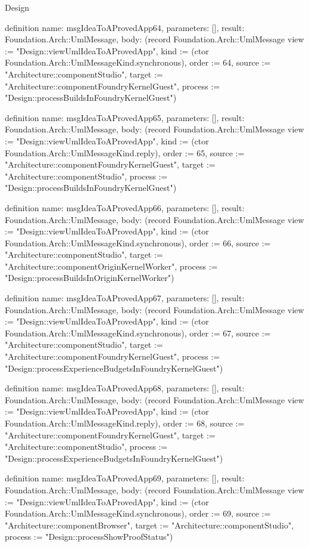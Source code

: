 \begin{lexlean}{Design}
\begin{semanticmodule}
definition{
  name: msgIdeaToAProvedApp64,
  parameters: [],
  result: Foundation.Arch::UmlMessage,
  body: (record Foundation.Arch::UmlMessage {view := "Design::viewUmlIdeaToAProvedApp", kind := (ctor Foundation.Arch::UmlMessageKind.synchronous), order := 64, source := "Architecture::componentStudio", target := "Architecture::componentFoundryKernelGuest", process := "Design::processBuildsInFoundryKernelGuest"})
}

definition{
  name: msgIdeaToAProvedApp65,
  parameters: [],
  result: Foundation.Arch::UmlMessage,
  body: (record Foundation.Arch::UmlMessage {view := "Design::viewUmlIdeaToAProvedApp", kind := (ctor Foundation.Arch::UmlMessageKind.reply), order := 65, source := "Architecture::componentFoundryKernelGuest", target := "Architecture::componentStudio", process := "Design::processBuildsInFoundryKernelGuest"})
}

definition{
  name: msgIdeaToAProvedApp66,
  parameters: [],
  result: Foundation.Arch::UmlMessage,
  body: (record Foundation.Arch::UmlMessage {view := "Design::viewUmlIdeaToAProvedApp", kind := (ctor Foundation.Arch::UmlMessageKind.synchronous), order := 66, source := "Architecture::componentStudio", target := "Architecture::componentOriginKernelWorker", process := "Design::processBuildsInOriginKernelWorker"})
}

definition{
  name: msgIdeaToAProvedApp67,
  parameters: [],
  result: Foundation.Arch::UmlMessage,
  body: (record Foundation.Arch::UmlMessage {view := "Design::viewUmlIdeaToAProvedApp", kind := (ctor Foundation.Arch::UmlMessageKind.synchronous), order := 67, source := "Architecture::componentStudio", target := "Architecture::componentFoundryKernelGuest", process := "Design::processExperienceBudgetsInFoundryKernelGuest"})
}

definition{
  name: msgIdeaToAProvedApp68,
  parameters: [],
  result: Foundation.Arch::UmlMessage,
  body: (record Foundation.Arch::UmlMessage {view := "Design::viewUmlIdeaToAProvedApp", kind := (ctor Foundation.Arch::UmlMessageKind.reply), order := 68, source := "Architecture::componentFoundryKernelGuest", target := "Architecture::componentStudio", process := "Design::processExperienceBudgetsInFoundryKernelGuest"})
}

definition{
  name: msgIdeaToAProvedApp69,
  parameters: [],
  result: Foundation.Arch::UmlMessage,
  body: (record Foundation.Arch::UmlMessage {view := "Design::viewUmlIdeaToAProvedApp", kind := (ctor Foundation.Arch::UmlMessageKind.synchronous), order := 69, source := "Architecture::componentBrowser", target := "Architecture::componentStudio", process := "Design::processShowProofStatus"})
}


\end{semanticmodule}
\end{lexlean}
